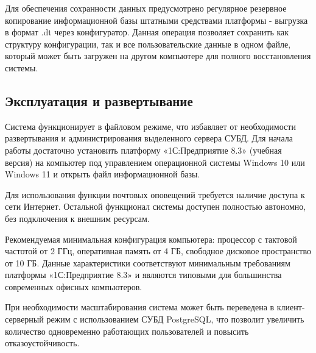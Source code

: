 Для обеспечения сохранности данных предусмотрено регулярное резервное копирование информационной базы штатными средствами платформы - выгрузка в формат .dt через конфигуратор. Данная операция позволяет сохранить как структуру конфигурации, так и все пользовательские данные в одном файле, который может быть загружен на другом компьютере для полного восстановления системы.

\subsection{Эксплуатация и развертывание}

Система функционирует в файловом режиме, что избавляет от необходимости развертывания и администрирования выделенного сервера СУБД. Для начала работы достаточно установить платформу «1С:Предприятие 8.3» (учебная версия) на компьютер под управлением операционной системы Windows 10 или Windows 11 и открыть файл информационной базы.

Для использования функции почтовых оповещений требуется наличие доступа к сети Интернет. Остальной функционал системы доступен полностью автономно, без подключения к внешним ресурсам.

Рекомендуемая минимальная конфигурация компьютера: процессор с тактовой частотой от 2 ГГц, оперативная память от 4 ГБ, свободное дисковое пространство от 10 ГБ. Данные характеристики соответствуют минимальным требованиям платформы «1С:Предприятие 8.3» и являются типовыми для большинства современных офисных компьютеров.

При необходимости масштабирования система может быть переведена в клиент-серверный режим с использованием СУБД PostgreSQL, что позволит увеличить количество одновременно работающих пользователей и повысить отказоустойчивость.